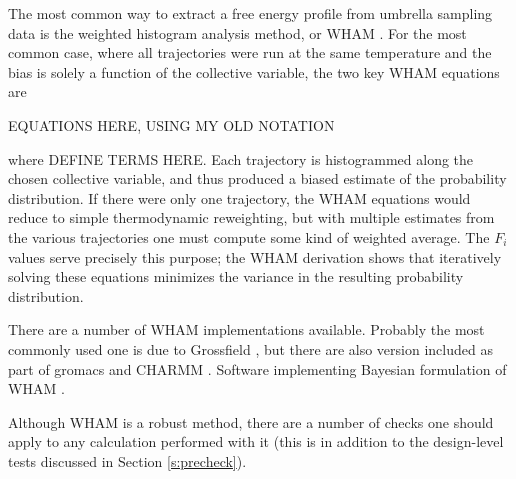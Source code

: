 
The most common way to extract a free energy profile from umbrella sampling data
is the weighted histogram analysis method, or WHAM \cite{Swendsen-1995, Roux-1995, Swendsen-1992}.
For the most common case, where all
trajectories were run at the same temperature and the bias is solely a function
of the collective variable, the two key WHAM equations are

EQUATIONS HERE, USING MY OLD NOTATION

where DEFINE TERMS HERE. Each trajectory is histogrammed along the chosen
collective variable, and thus produced a biased estimate of the probability
distribution. If there were only one trajectory, the WHAM equations would reduce
to simple thermodynamic reweighting, but with multiple estimates from the
various trajectories one must compute some kind of weighted average.  The  $F_i$
values serve precisely this purpose; the WHAM derivation shows that iteratively
solving these equations minimizes the variance in the resulting probability
distribution.

There are a number of WHAM implementations available.  Probably the most commonly used one is due to Grossfield \cite{WHAM}, but there are also version included as part of gromacs \cite{Lindahl-2013} and CHARMM \cite{CHARMM2009}. Software implementing Bayesian formulation of WHAM \cite{ferguson2017bayeswham}.

Although WHAM is a robust method, there are a number of checks one should apply
to any calculation performed with it (this is in addition to the design-level
tests discussed in Section \ref{s:precheck}).

